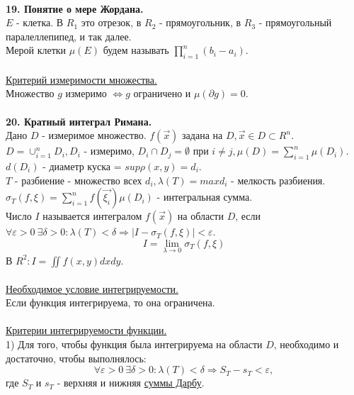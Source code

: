 \documentclass[12pt]{article}
\begin{document}
\\
\label{question19_1}\textbf{19. Понятие о мере Жордана.}\\
$E$ - клетка. В $R_1$ это отрезок, в $R_2$ - прямоугольник, в $R_3$ - прямоугольный паралеллепипед, и так далее.\\
Мерой клетки $\mu (E)$ будем называть $\prod_{i=1}^n (b_i - a_i)$.\\
\\
\label{question19_2}\uline{Критерий измеримости множества.}\\
Множество $g$ измеримо $\iff g$ ограничено и $\mu(\partial g) = 0$.\\
\\
\label{question20_1}\textbf{20. Кратный интеграл Римана.}\\
Дано $D$ - измеримое множество. $f(\overrightarrow{x})$ задана на $D, \overrightarrow{x} \in D \subset R^n$.\\
$D = \cup_{i=1}^n D_i, D_i$ - измеримо, $D_i \cap D_j = \emptyset$ при $i \neq j, \mu (D) = \sum_{i=1}^n \mu(D_i)$.\\
$d(D_i)$ - диаметр куска = $sup \rho(x,y) = d_i$.\\
$T$ - разбиение - множество всех $d_i, \lambda(T) = max d_i$ - мелкость разбиения.\\
$\sigma_T(f, \xi) = \sum_{i=1}^n f(\overrightarrow{\xi_i}) \mu(D_i)$ - интегральная сумма.\\
Число $I$ называется интегралом $f(\overrightarrow{x})$ на области $D$, если $\forall \varepsilon >0 \ \exists \delta > 0 : \lambda(T)<\delta \Rightarrow |I - \sigma_T(f,\xi)|<\varepsilon$.\\
$$I = \lim_{\lambda\to 0} \sigma_T (f,\xi)$$
В $R^2: I = \iint f(x,y)dxdy$.\\
\\
\label{question20_2}\uline{Необходимое условие интегрируемости.}\\
Если функция интегрируема, то она ограничена.\\
\\
\label{question20_3}\uline{Критерии интегрируемости функции.}\\
1) Для того, чтобы функция была интегрируема на области $D$, необходимо и достаточно, чтобы выполнялось:\\
$$\forall \varepsilon > 0 \ \exists \delta > 0 : \lambda(T) < \delta \Rightarrow S_T - s_T < \varepsilon,$$
где $S_T$ и $s_T$ - верхняя и нижняя \hyperref[darbouxSum]{суммы Дарбу}.\\
\end{document}
